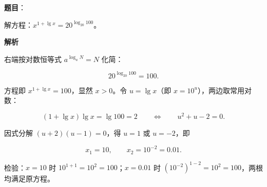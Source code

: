 \begin{answer}

\textbf{题目}：

解方程：$x^{1+\lg x}=20^{\log_{20}100}$。

\textbf{解析}

右端按对数恒等式 $a^{\log_{a}N}=N$ 化简：

\nopagebreak[4]
\[
20^{\log_{20}100}=100.
\]

方程即 $x^{1+\lg x}=100$，显然 $x>0$。令 $u=\lg x$（即 $x=10^{u}$），两边取常用对数：

\nopagebreak[4]
\[
(1+\lg x)\lg x=\lg 100=2
\qquad\Longleftrightarrow\qquad
u^{2}+u-2=0.
\]

因式分解 $(u+2)(u-1)=0$，得 $u=1$ 或 $u=-2$，即

\nopagebreak[4]
\[
x_{1}=10,\qquad x_{2}=10^{-2}=0.01.
\]

检验：$x=10$ 时 $10^{1+1}=10^{2}=100$；$x=0.01$ 时 $(10^{-2})^{1-2}=10^{2}=100$，两根均满足原方程。


\end{answer}
